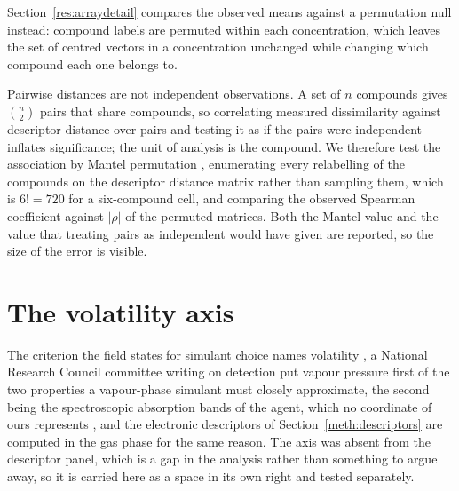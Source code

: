 \documentclass[11pt,a4paper]{article}
\begin{document}
Section~\ref{res:arraydetail} compares the observed means against a
permutation null instead: compound labels are permuted within each
concentration, which leaves the set of centred vectors in a concentration
unchanged while changing which compound each one belongs to.

Pairwise distances are not independent observations. A set of $n$ compounds
gives $\binom{n}{2}$ pairs that share compounds, so correlating measured
dissimilarity against descriptor distance over pairs and testing it as if the
pairs were independent inflates significance; the unit of analysis is the
compound. We therefore test the association by Mantel permutation
\cite{mantel1967}, enumerating every relabelling of the compounds on the
descriptor distance matrix rather than sampling them, which is $6! = 720$ for a
six-compound cell, and comparing the observed Spearman
coefficient against $|\rho|$ of the permuted matrices. Both the Mantel value and
the value that treating pairs as independent would have given are reported, so
the size of the error is visible.

\section{The volatility axis}
\label{meth:vol}

The criterion the field states for simulant choice names volatility
\cite{webb2025}, a National Research Council committee writing on detection put
vapour pressure first of the two properties a vapour-phase simulant must
closely approximate, the second being the spectroscopic absorption bands of the
agent, which no coordinate of ours represents \cite{nrc2003standoff}, and the
electronic descriptors of
Section~\ref{meth:descriptors} are computed in the gas phase for the same
reason. The axis was absent from the descriptor panel, which is a gap in the
analysis rather than something to argue away, so it is carried here as a space
in its own right and tested separately.
\end{document}
